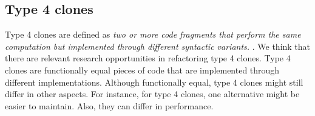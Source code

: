 



\subsection{Type 4 clones}
Type 4 clones are defined as \textit{two or more code fragments that perform the same computation but implemented through different syntactic variants.} \cite{roy2007survey}. We think that there are relevant research opportunities in refactoring type 4 clones. Type 4 clones are functionally equal pieces of code that are implemented through different implementations. Although functionally equal, type 4 clones might still differ in other aspects. For instance, for type 4 clones, one alternative might be easier to maintain. Also, they can differ in performance.

